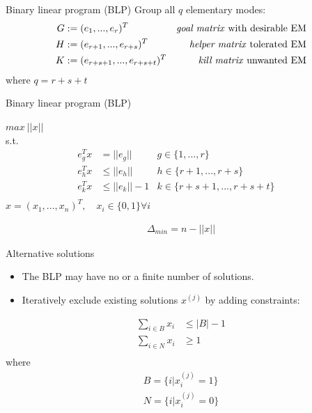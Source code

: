 \documentclass{beamer}
\begin{document}
\begin{frame}{Binary linear program (BLP)}
    Group all $q$ elementary modes:
    \begin{align*}
        G &:= (e_{1}, ..., e_{r})^{T}            &\text{\emph{goal matrix} with desirable EM}   &\\
        H &:= (e_{r+1}, ..., e_{r+s})^{T}        &\text{\emph{helper matrix} tolerated EM}      &\\
        K &:= (e_{r+s+1}, ..., e_{r+s+t})^{T}    &\text{\emph{kill matrix} unwanted EM}         &\\
    \end{align*}
where $q = r+s+t$
\end{frame}

\begin{frame}{Binary linear program (BLP)}
    
$max ~||x||$ \\
s.t. 
\begin{align*}
    e^{T}_{g} x & =       ||e_{g}||      & g \in \{1, ..., r\}     &~\\
    e^{T}_{h} x & \leq    ||e_{h}||     & h \in \{r+1, ..., r+s\} &~\\
    e^{T}_{k} x & \leq    ||e_{k}||-1  & k \in \{r+s+1, ..., r+s+t\} &~\\
\end{align*}
$x = (x_{1}, ..., x_{n})^{T}, \quad x_{i} \in \{0, 1\} \forall i$

\begin{align*}
    \Delta_{min} = n - ||x||
\end{align*}

\end{frame}

\begin{frame}{Alternative solutions}
\begin{itemize}
    \item The BLP may have no or a finite number of solutions.
    \item Iteratively exclude existing solutions $x^{(j)}$ by adding constraints:
\end{itemize}
    
    \begin{align*}
        \sum_{i \in B} x_i & \leq |B| -1 \\
        \sum_{i \in N} x_i & \geq 1   \\
    \end{align*}
    where 
    \begin{align*}
        B = \{i |x_{i}^{(j)} = 1\} \\
        N = \{i |x_{i}^{(j)} = 0\} \\
    \end{align*}

\end{frame}
\end{document}
